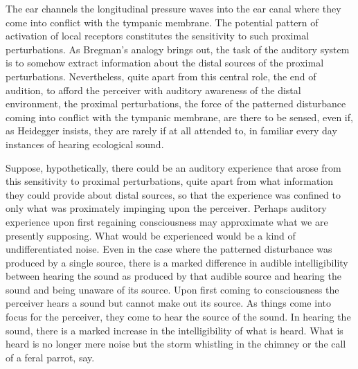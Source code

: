 The ear channels the longitudinal pressure waves into the ear canal where they come into conflict with the tympanic membrane. The potential pattern of activation of local receptors constitutes the sensitivity to such proximal perturbations. As Bregman's analogy brings out, the task of the auditory system is to somehow extract information about the distal sources of the proximal perturbations. Nevertheless, quite apart from this central role, the end of audition, to afford the perceiver with auditory awareness of the distal environment, the proximal perturbations, the force of the patterned disturbance coming into conflict with the tympanic membrane, are there to be sensed, even if, as Heidegger insists, they are rarely if at all attended to, in familiar every day instances of hearing ecological sound.

Suppose, hypothetically, there could be an auditory experience that arose from this sensitivity to proximal perturbations, quite apart from what information they could provide about distal sources, so that the experience was confined to only what was proximately impinging upon the perceiver. Perhaps auditory experience upon first regaining consciousness may approximate what we are presently supposing. What would be experienced would be a kind of undifferentiated noise. Even in the case where the patterned disturbance was produced by a single source, there is a marked difference in audible intelligibility between hearing the sound as produced by that audible source and hearing the sound and being unaware of its source. Upon first coming to consciousness the perceiver hears a sound but cannot make out its source. As things come into focus for the perceiver, they come to hear the source of the sound. In hearing the sound, there is a marked increase in the intelligibility of what is heard. What is heard is no longer mere noise but the storm whistling in the chimney or the call of a feral parrot, say.

